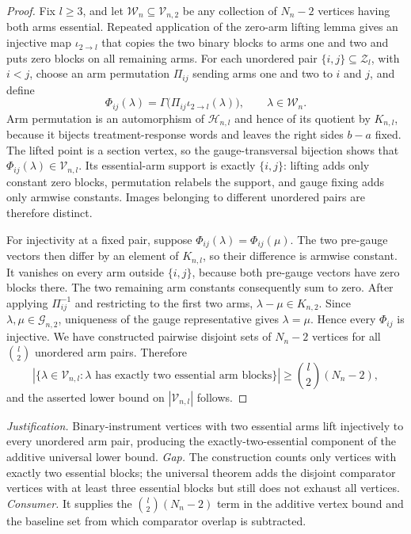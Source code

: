 \documentclass{article}
\begin{document}
\begin{proof}
Fix \(l\ge3\), and let \(\mathcal W_n\subseteq\mathcal V_{n,2}\) be any collection of \(N_n-2\) vertices having both arms essential. Repeated application of the zero-arm lifting lemma gives an injective map \(\iota_{2\to l}\) that copies the two binary blocks to arms one and two and puts zero blocks on all remaining arms. For each unordered pair \(\{i,j\}\subseteq\mathcal Z_l\), with \(i<j\), choose an arm permutation \(\Pi_{ij}\) sending arms one and two to \(i\) and \(j\), and define
\[\Phi_{ij}(\lambda)=\Gamma\bigl(\Pi_{ij}\iota_{2\to l}(\lambda)\bigr),\qquad \lambda\in\mathcal W_n.\]
Arm permutation is an automorphism of \(\mathcal H_{n,l}\) and hence of its quotient by \(K_{n,l}\), because it bijects treatment-response words and leaves the right sides \(b-a\) fixed. The lifted point is a section vertex, so the gauge-transversal bijection shows that \(\Phi_{ij}(\lambda)\in\mathcal V_{n,l}\). Its essential-arm support is exactly \(\{i,j\}\): lifting adds only constant zero blocks, permutation relabels the support, and gauge fixing adds only armwise constants. Images belonging to different unordered pairs are therefore distinct.

For injectivity at a fixed pair, suppose \(\Phi_{ij}(\lambda)=\Phi_{ij}(\mu)\). The two pre-gauge vectors then differ by an element of \(K_{n,l}\), so their difference is armwise constant. It vanishes on every arm outside \(\{i,j\}\), because both pre-gauge vectors have zero blocks there. The two remaining arm constants consequently sum to zero. After applying \(\Pi_{ij}^{-1}\) and restricting to the first two arms, \(\lambda-\mu\in K_{n,2}\). Since \(\lambda,\mu\in\mathcal G_{n,2}\), uniqueness of the gauge representative gives \(\lambda=\mu\). Hence every \(\Phi_{ij}\) is injective. We have constructed pairwise disjoint sets of \(N_n-2\) vertices for all \(\binom l2\) unordered arm pairs. Therefore
\[|\{\lambda\in\mathcal V_{n,l}:\lambda\text{ has exactly two essential arm blocks}\}|\ge\binom l2(N_n-2),\]
and the asserted lower bound on \(|\mathcal V_{n,l}|\) follows.
\end{proof}
\par\smallskip\noindent \textit{Justification.} Binary-instrument vertices with two essential arms lift injectively to every unordered arm pair, producing the exactly-two-essential component of the additive universal lower bound. \textit{Gap.} The construction counts only vertices with exactly two essential blocks; the universal theorem adds the disjoint comparator vertices with at least three essential blocks but still does not exhaust all vertices. \textit{Consumer.} It supplies the \(\binom l2(N_n-2)\) term in the additive vertex bound and the baseline set from which comparator overlap is subtracted.
\end{document}

